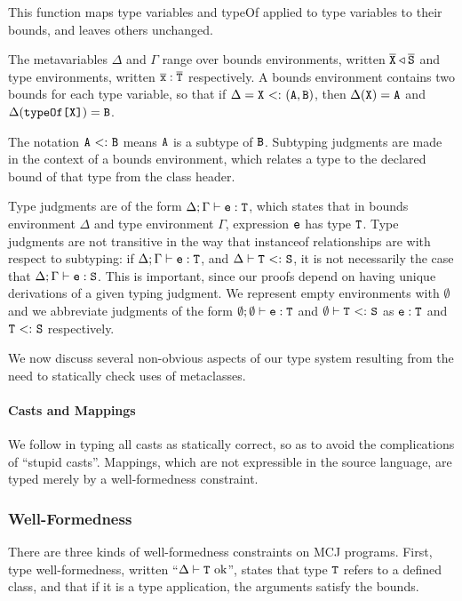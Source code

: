 \documentclass{acm-sigplan}
\begin{document}
This function maps type variables and {\txt typeOf} applied to type
variables to their bounds, and leaves others unchanged.

The metavariables $\Delta$ and $\Gamma$ range over bounds
environments, written ${\overline{{\mbox {\tt X}}}} \triangleleft {\overline{{\mbox {\tt S}}}}$ and type environments,
written ${{\overline{{\mbox {\tt x}}}}} : {{\overline{{\mbox {\tt T}}}}}$ respectively.  A bounds environment contains
two bounds for each type variable, so that if $\Delta = \mbox {\tt X} {\ <:\ }
(\mbox {\tt A},\mbox {\tt B})$, then $\Delta(\mbox {\tt X}) = \mbox {\tt A}$ and $\Delta({{\mbox {\tt typeOf\mbox{\tt [}\ensuremath{\mbox {\tt X}}\mbox{\tt ]}}}}) = \mbox {\tt B}$.

The notation $\mbox {\tt A} {\ <:\ } \mbox {\tt B}$ means $\mbox {\tt A}$ is a subtype of $\mbox {\tt B}$.
Subtyping judgments are made in the context of a bounds environment,
which relates a type to the declared bound of that type from the class
header.

Type judgments are of the form ${\Delta;\Gamma} \vdash {\ensuremath{{\mbox {\tt e}} : {\mbox {\tt T}}}}$, which states
that in bounds environment $\Delta$ and type environment $\Gamma$,
expression $\mbox {\tt e}$ has type $\mbox {\tt T}$.  Type judgments are not transitive in
the way that {\txt instanceof} relationships are with respect to
subtyping: if ${\Delta;\Gamma} \vdash {\ensuremath{{\mbox {\tt e}} : {\mbox {\tt T}}}}$, and ${\Delta} \vdash {\ensuremath{{\mbox {\tt T}} {\ <:\ } {\mbox {\tt S}}}}$, it is not necessarily the case that ${\Delta;\Gamma} \vdash {\ensuremath{{\mbox {\tt e}} : {\mbox {\tt S}}}}$.
This is important, since our proofs depend on having unique
derivations of a given typing judgment. We represent empty
environments with $\emptyset$ and we abbreviate judgments of the form
${\emptyset;\emptyset} \vdash {\ensuremath {{\mbox {\tt e}} : {\mbox {\tt T}}}}$ and ${\emptyset} \vdash {\ensuremath {{\mbox {\tt T}} {\ <:\ } {\mbox {\tt S}}}}$ as ${{\mbox {\tt e}} : {\mbox {\tt T}}}$ and ${{\mbox {\tt T}} {\ <:\ } {\mbox {\tt S}}}$ respectively.

We now discuss several non-obvious aspects of our type system
resulting from the need to statically check uses of metaclasses.


\paragraph{Casts and Mappings}
We follow \cite{MixGen} in typing all casts as statically correct, so as to
avoid the complications of ``stupid casts''.  Mappings, which are not
expressible in the source language, are typed merely by a
well-formedness constraint.

\subsubsection{Well-Formedness}

There are three kinds of well-formedness constraints on MCJ
programs.  First, type well-formedness, written ``${\Delta} \vdash {\mbox {\tt T}} \mbox{\textrm {\ ok}}$'',
states that type $\mbox {\tt T}$ refers to a defined class, and that if it is a type
application, the arguments satisfy the bounds.
\end{document}
